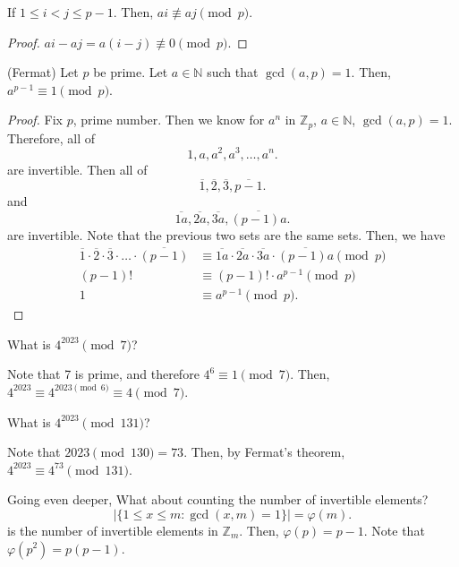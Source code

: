 \begin{lemma}
	If \( 1 \le i < j \le p-1 \). Then, \( ai \not\equiv aj \pmod p \).
\end{lemma}

\begin{proof}
	\( ai-aj = a(i-j) \not\equiv 0 \pmod p \). 
\end{proof}

\begin{theorem}
	(Fermat) Let \( p \) be prime. Let \( a \in \mathbb{N} \) such that \( \gcd(a,p)=1\). Then, \( a^{p-1}\equiv 1 \pmod p \).
\end{theorem}

\begin{proof}
	Fix \( p \), prime number. Then we know for \( a^n \) in \( \mathbb{Z}_p \), \( a\in \mathbb{N} \),  \( \gcd(a,p)=1 \). Therefore, all of \[
		1, a, a^2, a^3, \ldots , a^{n}
	.\] are invertible. Then all of \[
		\overline{1}, \overline{2}, \overline{3}, \overline{p-1} 
	.\] and \[
		\overline{1a}, \overline{2a}, \overline{3a}, \overline{(p-1)a} 
	.\] are invertible. Note that the previous two sets are the same sets. Then, we have
	\begin{align*}
		\overline{1}\cdot \overline{2}\cdot \overline{3}\cdot \ldots \cdot \overline{(p-1)} &\equiv \overline{1a}\cdot \overline{2a}\cdot \overline{3a}\cdot \overline{(p-1)a}     \pmod p \\
		(p-1)! &\equiv (p-1)! \cdot a^{p-1}  \pmod p \\
						1 &\equiv a^{p-1} \pmod p
	.\end{align*}
\end{proof}

\begin{eg}
	What is \( 4^{2023} \pmod 7  \)?
\end{eg}

Note that 7 is prime, and therefore \( 4^{6}\equiv 1 \pmod 7   \). Then, \( 4^{2023} \equiv 4^{2023 \pmod 6} \equiv 4 \pmod 7 \).

\begin{eg}
	What is \( 4^{2023} \pmod {131} \)?
\end{eg}

Note that \( 2023 \pmod {130} = 73 \). Then, by Fermat's theorem, \( 4^{2023} \equiv 4^{73} \pmod {131}   \).

Going even deeper, What about counting the number of invertible elements?
\[
	\left| \{1 \le  x \le m \colon \gcd(x,m)=1\}   \right| = \varphi(m)
.\] is the number of invertible elements in \( \mathbb{Z}_m \). Then, \( \varphi(p)=p-1 \). Note that \( \varphi(p^2)=p(p-1) \).


